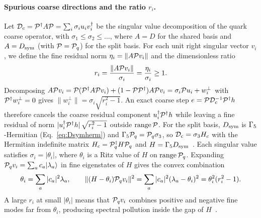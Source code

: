 \paragraph{Spurious coarse directions and the ratio $r_i$.}
Let $\mathcal D_{\mathrm c}=\mathcal P^{\dagger} A\mathcal P=\sum_i\sigma_i u_i v_i^{\dagger}$ be the singular value decomposition of the quark
coarse operator, with $\sigma_1\le\sigma_2\le\dots$, where $A=D$ for the shared basis and
$A=D_{\mathrm{sym}}$ (with $\mathcal P=\mathcal P_q$) for the split basis. For each unit right singular vector $v_i$, we
define the fine residual norm $\eta_i=\|A\mathcal P v_i\|$ and the dimensionless ratio
\begin{equation}
r_i=\frac{\|A\mathcal P v_i\|}{\sigma_i}=\frac{\eta_i}{\sigma_i}\ge1 .
\label{eq:ratio_r}
\end{equation}
Decomposing $A\mathcal P v_i=\mathcal P(\mathcal P^{\dagger} A\mathcal P v_i)+(1-\mathcal P\mathcal P^{\dagger})A\mathcal P v_i=\sigma_i\mathcal P u_i+w_i^\perp$
with $\mathcal P^{\dagger} w_i^\perp=0$ gives $\|w_i^\perp\|=\sigma_i\sqrt{r_i^2-1}$. An exact coarse step
$e=\mathcal P\mathcal D_{\mathrm c}^{-1}\mathcal P^{\dagger} h$ therefore cancels the coarse residual component $u_i^{\dagger}\mathcal P^{\dagger} h$ while
leaving a fine residual of norm $|u_i^{\dagger}\mathcal P^{\dagger} h|\,\sqrt{r_i^2-1}$ outside $\operatorname{range}\mathcal P$.
For the split basis, $D_{\mathrm{sym}}$ is $\Gamma_5$-Hermitian (Eq.~\eqref{eq:Dsymherm}) and $\Gamma_5\mathcal P_q=\mathcal P_q\sigma_3$,
so $\mathcal D_{\mathrm c}=\sigma_3 H_c$ with the Hermitian indefinite matrix $H_c=\mathcal P_q^{\dagger} H\mathcal P_q$ and $H=\Gamma_5D_{\mathrm{sym}}$~\cite{BY}.
Each singular value satisfies $\sigma_i=|\theta_i|$, where $\theta_i$ is a Ritz value of $H$ on
$\operatorname{range}\mathcal P_q$. Expanding $\mathcal P_q v_i=\sum_a c_a|\lambda_a\rangle$ in fine eigenstates of
$H$ gives the convex combination~\cite{BrowerStag}
\begin{equation}
\theta_i=\sum_a |c_a|^2\lambda_a , \qquad
\|(H-\theta_i)\mathcal P_q v_i\|^2=\sum_a |c_a|^2(\lambda_a-\theta_i)^2=\theta_i^2(r_i^2-1) .
\label{eq:pollution}
\end{equation}
A large $r_i$ at small $|\theta_i|$ means that $\mathcal P_q v_i$ combines positive and negative fine modes
far from $\theta_i$, producing spectral pollution inside the gap of $H$~\cite{LevitinShargorodsky,BCHW}.

